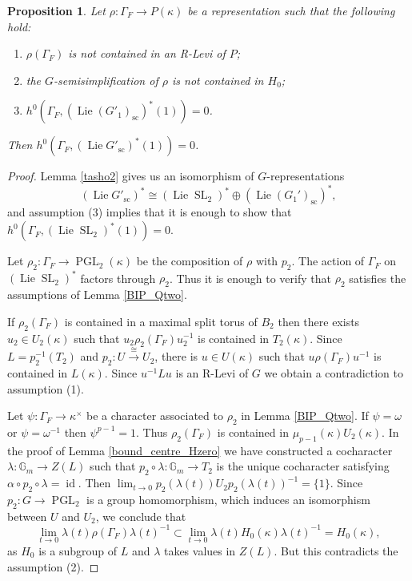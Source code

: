 \documentclass{amsart}
\newtheorem{prop}{Proposition}[section]
\theoremstyle{definition}
\theoremstyle{remark}
\DeclareMathOperator{\SL}{SL}
\DeclareMathOperator{\id}{id}
\newcommand{\Gm}{\mathbb G_{m}}
\DeclareMathOperator{\PGL}{PGL}
\DeclareMathOperator{\Lie}{Lie}
\newcommand{\sic}{\operatorname{sc}}
\begin{document}
\begin{prop}\label{vanish_H2_please}  Let $\rho: \Gamma_F\rightarrow P(\kappa)$ 
be a representation such that the following hold: 
\begin{enumerate}
\item $\rho(\Gamma_F)$ is not contained in an R-Levi of $P$;
\item the $G$-semisimplification of $\rho$ is not contained in $H_0$;
\item $h^0(\Gamma_F, (\Lie (G'_1)_{\sic})^*(1))=0$. 
\end{enumerate}
Then $h^0(\Gamma_F, (\Lie G'_{\sic})^*(1))=0$. 
\end{prop}
\begin{proof} Lemma \ref{tasho2} gives us an isomorphism of $G$-representations 
$$(\Lie G'_{\sic})^*\cong (\Lie \SL_2)^* \oplus (\Lie (G_1')_{\sic})^*,$$ and assumption (3) implies that it is 
enough to show that $h^0(\Gamma_F, (\Lie \SL_2)^*(1))=0$.

Let $\rho_2: \Gamma_F \rightarrow \PGL_2(\kappa)$ be the composition of $\rho$ with $p_2$. 
The action of $\Gamma_F$ on $(\Lie \SL_2)^*$ factors through $\rho_2$. Thus it is enough to 
verify that $\rho_2$ satisfies the assumptions of Lemma \ref{BIP_Qtwo}.

If $\rho_2(\Gamma_F)$ is contained in a maximal split torus of $B_2$ then there exists $u_2\in U_2(\kappa)$ 
such that $u_2 \rho_2(\Gamma_F) u^{-1}_2$ is contained in $T_2(\kappa)$. Since $L= p_2^{-1}(T_2)$ and $p_2: U\overset{\cong}{\longrightarrow} U_2$, there is $u\in U(\kappa)$ such that
$u \rho(\Gamma_F) u^{-1}$ is contained in $L(\kappa)$. Since $u^{-1} L u$ is an R-Levi  of $G$ we obtain 
 a contradiction to assumption (1). 

Let $\psi:\Gamma_F \rightarrow \kappa^{\times}$ be a character associated to $\rho_2$ in Lemma 
\ref{BIP_Qtwo}. If $\psi= \omega$ or $\psi= \omega^{-1}$ then $\psi^{p-1}=1$. Thus 
$\rho_2(\Gamma_F)$ is contained in $\mu_{p-1}(\kappa) U_2(\kappa)$. In the proof of Lemma 
\ref{bound_centre_Hzero} we have constructed a cocharacter $\lambda: \Gm\rightarrow Z(L)$ such that 
$p_2\circ \lambda: \Gm\rightarrow T_2$ is the unique cocharacter satisfying $\alpha\circ p_2\circ\lambda=\id$. Then $\lim_{t\rightarrow 0} p_2(\lambda(t)) U_2 p_2(\lambda(t))^{-1}= \{1\}$.
Since $p_2: G\rightarrow \PGL_2$ is a group homomorphism, which induces an isomorphism between $U$ and $U_2$, we conclude that 
$$\lim_{t\rightarrow 0} \lambda(t) \rho(\Gamma_F) \lambda(t)^{-1}\subset  
\lim_{t\rightarrow 0} \lambda(t) H_0(\kappa)\lambda(t)^{-1}= H_0(\kappa),$$
as $H_0$ is a subgroup of $L$ and $\lambda$ takes values in $Z(L)$. But this contradicts the assumption 
(2).
\end{proof}
\end{document}
